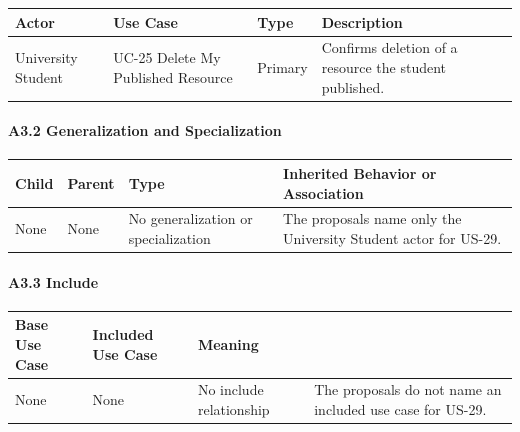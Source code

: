 \documentclass[12pt]{article}
\renewcommand{\baselinestretch}{1.5}
\begin{document}
\begingroup
\small
\renewcommand{\baselinestretch}{1.0}\selectfont
\renewcommand{\arraystretch}{1.15}
\setlength{\tabcolsep}{6pt}
\begin{longtable}{|>{\raggedright\arraybackslash}p{}|>{\raggedright\arraybackslash}p{}|>{\raggedright\arraybackslash}p{}|>{\raggedright\arraybackslash}p{}|}
\hline
\textbf{Actor} & \textbf{Use Case} & \textbf{Type} & \textbf{Description} \\ \hline
\endhead
University Student & UC-25 Delete My Published Resource & Primary & Confirms deletion of a resource the student published. \\ \hline
\end{longtable}
\endgroup
\par\medskip

\hypertarget{sec:a3-2-generalization-and-specialization}{}
\paragraph*{A3.2 Generalization and Specialization}
\par\medskip

\begingroup
\small
\renewcommand{\baselinestretch}{1.0}\selectfont
\renewcommand{\arraystretch}{1.15}
\setlength{\tabcolsep}{6pt}
\begin{longtable}{|>{\raggedright\arraybackslash}p{}|>{\raggedright\arraybackslash}p{}|>{\raggedright\arraybackslash}p{}|>{\raggedright\arraybackslash}p{}|}
\hline
\textbf{Child} & \textbf{Parent} & \textbf{Type} & \textbf{Inherited Behavior or Association} \\ \hline
\endhead
None & None & No generalization or specialization & The proposals name only the University Student actor for US-29. \\ \hline
\end{longtable}
\endgroup
\par\medskip

\hypertarget{sec:a3-3-include}{}
\paragraph*{A3.3 Include}
\par\medskip

\begingroup
\small
\renewcommand{\baselinestretch}{1.0}\selectfont
\renewcommand{\arraystretch}{1.15}
\setlength{\tabcolsep}{6pt}
\begin{longtable}{|>{\raggedright\arraybackslash}p{}|>{\raggedright\arraybackslash}p{}|>{\raggedright\arraybackslash}p{}|}
\hline
\textbf{Base Use Case} & \textbf{Included Use Case} & \textbf{Meaning} \\ \hline
\endhead
None & None & No include relationship & The proposals do not name an included use case for US-29. \\ \hline
\end{longtable}
\endgroup
\par\medskip
\end{document}
